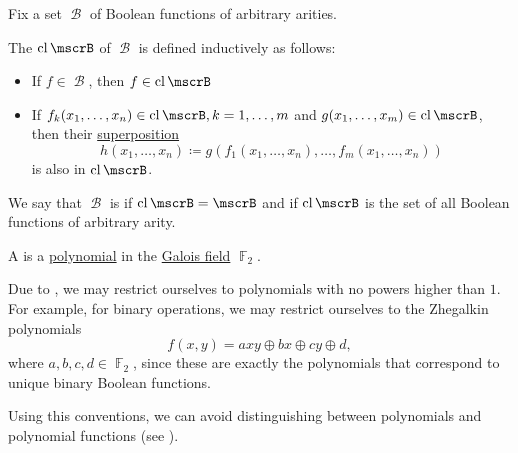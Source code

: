 \begin{definition}\label{def:boolean_closure}
  Fix a set \( \mscrB \) of Boolean functions of arbitrary arities.

  The  \( \Cl{\mscrB} \) of \( \mscrB \) is defined inductively as follows:
  \begin{itemize}
    \item If \( f \in \mscrB \), then \( f \in \Cl{\mscrB} \)
    \item If \( f_k(x_1, \ldots, x_n) \in \Cl{\mscrB}, k = 1, \ldots, m \) and \( g(x_1, \ldots, x_m) \in \Cl{\mscrB} \), then their \hyperref[def:function/superposition]{superposition}
    \begin{equation*}
      h(x_1, \ldots, x_n) \coloneqq g(f_1(x_1, \ldots, x_n), \ldots, f_m(x_1, \ldots, x_n))
    \end{equation*}
    is also in \( \Cl{\mscrB} \).
  \end{itemize}

  We say that \( \mscrB \) is  if \( \Cl{\mscrB} = \mscrB \) and  if \( \Cl{\mscrB} \) is the set of all Boolean functions of arbitrary arity.
\end{definition}

\begin{definition}\label{def:zhegalkin_polynomial}
  A  is a \hyperref[def:polynomial]{polynomial} in the \hyperref[thm:galois_field_existence]{Galois field} \( \BbbF_2 \).

  Due to , we may restrict ourselves to polynomials with no powers higher than \( 1 \). For example, for binary operations, we may restrict ourselves to the Zhegalkin polynomials
  \begin{equation}\label{eq:def:zhegalkin_polynomial/binary_polynomial}
    f(x, y) = axy \oplus bx \oplus cy \oplus d,
  \end{equation}
  where \( a, b, c, d \in \BbbF_2 \), since these are exactly the polynomials that correspond to unique binary Boolean functions.

  Using this conventions, we can avoid distinguishing between polynomials and polynomial functions (see ).
\end{definition}

